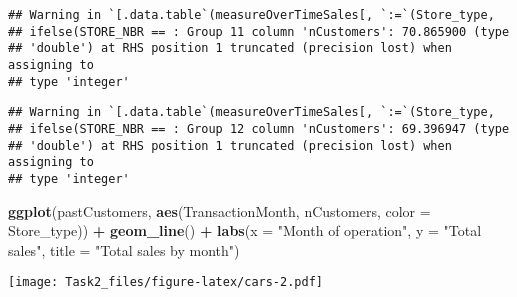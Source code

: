 \documentclass[
]{article}
\newenvironment{Shaded}{\begin{snugshade}}{\end{snugshade}}
\newcommand{\DataTypeTok}[1]{\textcolor[rgb]{0.13,0.29,0.53}{#1}}
\newcommand{\KeywordTok}[1]{\textcolor[rgb]{0.13,0.29,0.53}{\textbf{#1}}}
\newcommand{\NormalTok}[1]{#1}
\newcommand{\OperatorTok}[1]{\textcolor[rgb]{0.81,0.36,0.00}{\textbf{#1}}}
\newcommand{\StringTok}[1]{\textcolor[rgb]{0.31,0.60,0.02}{#1}}
\begin{document}
\begin{verbatim}
## Warning in `[.data.table`(measureOverTimeSales[, `:=`(Store_type,
## ifelse(STORE_NBR == : Group 11 column 'nCustomers': 70.865900 (type
## 'double') at RHS position 1 truncated (precision lost) when assigning to
## type 'integer'
\end{verbatim}

\begin{verbatim}
## Warning in `[.data.table`(measureOverTimeSales[, `:=`(Store_type,
## ifelse(STORE_NBR == : Group 12 column 'nCustomers': 69.396947 (type
## 'double') at RHS position 1 truncated (precision lost) when assigning to
## type 'integer'
\end{verbatim}

\begin{Shaded}
\begin{Highlighting}[]
\KeywordTok{ggplot}\NormalTok{(pastCustomers, }\KeywordTok{aes}\NormalTok{(TransactionMonth, nCustomers, }\DataTypeTok{color =}\NormalTok{ Store_type)) }\OperatorTok{+}
\StringTok{  }\KeywordTok{geom_line}\NormalTok{() }\OperatorTok{+}
\StringTok{  }\KeywordTok{labs}\NormalTok{(}\DataTypeTok{x =} \StringTok{"Month of operation"}\NormalTok{, }\DataTypeTok{y =} \StringTok{"Total sales"}\NormalTok{, }\DataTypeTok{title =} \StringTok{"Total sales by month"}\NormalTok{)}
\end{Highlighting}
\end{Shaded}

\texttt{[image: Task2\_files/figure-latex/cars-2.pdf]}
\end{document}
